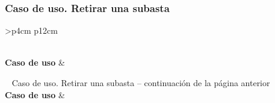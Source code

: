 \subsubsection{Caso de uso. Retirar una subasta} \label{sec:cu_retirar-subasta}
\begin{longtable}{
    >{}p{4cm}
    p{12cm}
    }
    \caption{Caso de uso. Retirar una subasta} \label{table:cu_retirar-subasta} \\
    \toprule
    \textbf{Caso de uso} &  \\
    \endfirsthead
    
    {{ \tablename\ \thetable{} Caso de uso. Retirar una subasta -- continuación de la página anterior}} \\
    \toprule
    \textbf{Caso de uso} &  \\
    \midrule
    \endhead
    
    \midrule
     \\ 
    \endfoot
    
    \bottomrule
    \endlastfoot
    

\end{longtable}
